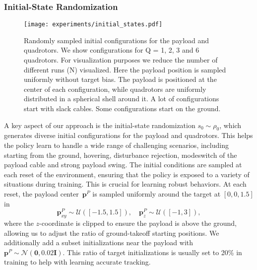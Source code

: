 \subsubsection{Initial-State Randomization}
\label{sec:reset}
\begin{figure}
    \centering
    \texttt{[image: experiments/initial\_states.pdf]}
    \caption[Initial States]{Randomly sampled initial configurations for the payload and quadrotors. We show configurations for Q = 1, 2, 3 and 6 quadrotors. For visualization purposes we reduce the number of different runs (N) visualized. Here the payload position is sampled uniformly without target bias. The payload is positioned at the center of each configuration, while quadrotors are uniformly distributed in a spherical shell around it. A lot of configurations start with slack cables. Some configurations start on the ground.}
    \label{fig:reset_config}
\end{figure}
A key aspect of our approach is the initial-state randomization $s_0\sim\rho_0$, which generates diverse initial configurations for the payload and quadrotors. This helps the policy learn to handle a wide range of challenging scenarios, including starting from the ground, hovering, disturbance rejection, modeswitch of the payload cable and strong payload swing. The initial conditions are sampled at each reset of the environment, ensuring that the policy is exposed to a variety of situations during training. This is crucial for learning robust behaviors. 
At each reset, the payload center~$\mathbf{p}^P$ is sampled uniformly around the target at $[0,0,1.5]$ in
\begin{equation}
    \mathbf{p}^P_{xy}\sim\mathcal{U}([-1.5,1.5]),\quad \mathbf{p}^P_z\sim\mathcal{U}([-1,3]),
\end{equation}
where the $z$-coordinate is clipped to ensure the payload is above the ground, allowing us to adjust the ratio of ground-takeoff starting positions. We additionally add a subset initializations near the payload with $\mathbf{p}^P\sim\mathcal{N}(\mathbf{0},0.02\mathbf{I})$. This ratio of target initializations is usually set to 20\% in training to help with learning accurate tracking.

